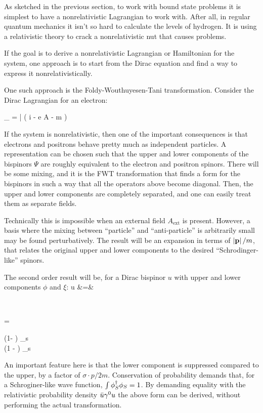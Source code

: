 As sketched in the previous section, to work with bound state problems it is simplest to have a nonrelativistic Lagrangian to work with.  After all, in regular quantum mechanics it isn't so hard to calculate the levels of hydrogen.  It is using a relativistic theory to crack a nonrelativistic nut that causes problems.

If the goal is to derive a nonrelativistic Lagrangian or Hamiltonian for the system, one approach is to start from the Dirac equation and find a way to express it nonrelativistically.

One such approach is the Foldy-Wouthuyesen-Tani transformation.  Consider the Dirac Lagrangian for an electron:

\beq
	_{} = 
		\bar{\Psi} \left( i \partial \cdot \gamma - e A \cdot \gamma - m \right) \Psi
\eeq 
		
If the system is nonrelativistic, then one of the important consequences is that electrons and positrons behave pretty much as independent particles.  A representation can be chosen such that the upper and lower components of the bispinors $\Psi$ are roughly equivalent to the electron and positron spinors.  There will be some mixing, and it is the FWT transformation that finds a form for the bispinors in such a way that all the operators above become diagonal.  Then, the upper and lower components are completely separated, and one can easily treat them as separate fields.

Technically this is impossible when an external field $A_{\text{ext}}$ is present.  However, a basis where the mixing between ``particle'' and ``anti-particle'' is arbitrarily small may be found perturbatively.  The result will be an expansion in terms of $\left| \mathbf{p} \right| / m$, that relates the original upper and lower components to the desired ``Schrodinger-like'' spinors.

The second order result will be, for a Dirac bispinor $u$ with upper and lower components $\phi$ and $\xi$:
\beqa
	u &=& \begin{pmatrix}\phi \\ \chi \end{pmatrix} = \begin{pmatrix} (1- ) \phi_s \\  (1 -  ) \phi_s \end{pmatrix}
\eeqa
An important feature here is that the lower component is suppressed compared to the upper, by a factor of $\sigma \cdot p / 2m$.  Conservation of probability demands that, for a Schroginer-like wave function, $\int \phi_S^\dagger \phi_S = 1$.  By demanding equality with the relativistic probability density $\bar{u} \gamma^0 u$ the above form can be derived, without performing the actual transformation.

